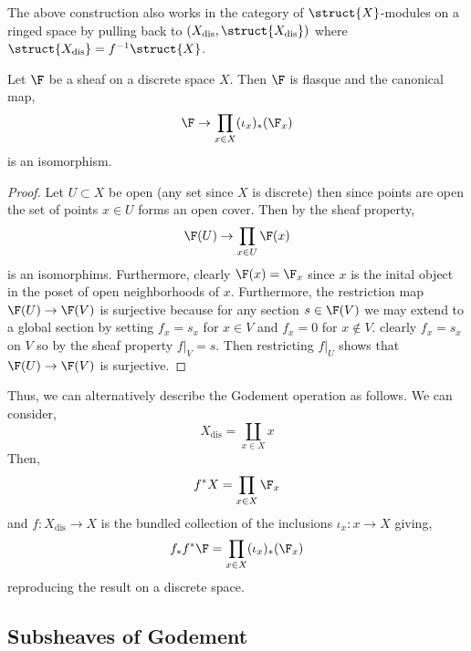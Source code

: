 \documentclass[12pt]{article}
\begin{document}
\begin{rmk}
The above construction also works in the category of $\struct{X}$-modules on a ringed space by pulling back to $(X_{\text{dis}}, \struct{X_{\text{dis}}})$ where $\struct{X_{\text{dis}}} = f^{-1} \struct{X}$.
\end{rmk}

\begin{lemma}
Let $\F$ be a sheaf on a discrete space $X$. Then $\F$ is flasque and the canonical map,
\[ \F \to \prod_{x \in X} (\iota_x)_* (\F_x) \]
is an isomorphism.
\end{lemma}

\begin{proof}
Let $U \subset X$ be open (any set since $X$ is discrete) then since points are open the set of points $x \in U$ forms an open cover. Then by the sheaf property,
\[ \F(U) \to \prod_{x \in U} \F(x) \]
is an isomorphims. Furthermore, clearly $\F(x) = \F_x$ since $x$ is the inital object in the poset of open neighborhoods of $x$. Furthermore, the restriction map $\F(U) \to \F(V)$ is surjective because for any section $s \in \F(V)$ we may extend to a global section by setting $f_x = s_x$ for $x \in V$ and $f_x = 0$ for $x \notin V$. clearly $f_x = s_x$ on $V$ so by the sheaf property $f|_V = s$. Then restricting $f|_U$ shows that $\F(U) \to \F(V)$ is surjective.
\end{proof}
\noindent
Thus, we can alternatively describe the Godement operation as follows. We can consider,
\[ X_{\text{dis}} = \coprod_{x \in X} x \]
Then,
\[ f^* X = \prod_{x \in X} \F_x \]
and $f : X_{\text{dis}} \to X$ is the bundled collection of the inclusions $\iota_x : x \to X$ giving,
\[ f_* f^* \F = \prod_{x \in X} (\iota_x)_* (\F_x) \]
reproducing the result on a discrete space.

\subsection{Subsheaves of Godement}
\end{document}
